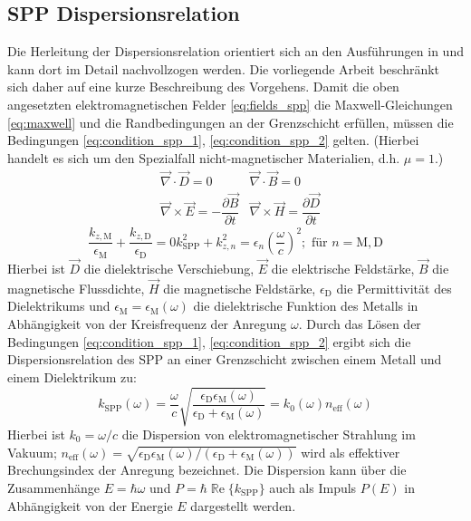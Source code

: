 \documentclass[a4paper, titlepage,  ngerman, fullpage]{book}
\renewcommand{\Re}{\operatorname{\mathbb{R}e}}
\begin{document}
	\subsection{SPP Dispersionsrelation}
	Die Herleitung der Dispersionsrelation orientiert sich an den Ausführungen in \cite[pp.~261--ff]{Fox.2020} und kann dort im Detail nachvollzogen werden. Die vorliegende Arbeit beschränkt sich daher auf eine kurze Beschreibung des Vorgehens. Damit die oben angesetzten elektromagnetischen Felder \eqref{eq:fields_spp}  die Maxwell-Gleichungen \eqref{eq:maxwell} und die Randbedingungen an der Grenzschicht erfüllen, müssen die Bedingungen \eqref{eq:condition_spp_1},  \eqref{eq:condition_spp_2} gelten. (Hierbei handelt es sich um den Spezialfall nicht-magnetischer Materialien, d.h. $\mu = 1$.)
	\begin{align}
		\label{eq:maxwell}	
		&\vec{\nabla}\cdot\vec{D} = 0		&\vec{\nabla}\cdot\vec{B} = 0 \\
		&\vec{\nabla}\times\vec{E} = -\dfrac{\partial\vec{B}}{\partial t} 
		&\vec{\nabla}\times\vec{H} = 	\dfrac{\partial\vec{D}}{\partial t}\nonumber
	\end{align}
	\begin{subequations}
		\begin{equation}
			\label{eq:condition_spp_1}
			\dfrac{k_{z, \mathrm{M}}}{\epsilon_\mathrm{M}} + \dfrac{k_{z, \mathrm{D}}}{\epsilon_\mathrm{D}} = 0
		\end{equation}		
		\begin{equation}
			\label{eq:condition_spp_2}
			k_{\mathrm{SPP}}^2 +k_{z, n}^2 = \epsilon_n\left(\dfrac{\omega}{c}\right)^2; \text{ für  } n=\mathrm{M,D}
		\end{equation}
	\end{subequations}
	Hierbei ist $\vec{D}$ die dielektrische Verschiebung, $\vec{E}$ die elektrische Feldstärke, $\vec{B}$ die magnetische Flussdichte, $\vec{H}$ die magnetische Feldstärke, 	$\epsilon_\mathrm{D}$ die Permittivität des Dielektrikums und $\epsilon_\mathrm{M} = \epsilon_\mathrm{M}(\omega)$ die dielektrische Funktion des Metalls in Abhängigkeit von der Kreisfrequenz der Anregung $\omega$. Durch das Lösen der Bedingungen \eqref{eq:condition_spp_1},  \eqref{eq:condition_spp_2} ergibt sich die Dispersionsrelation des SPP an einer Grenzschicht zwischen einem Metall und einem Dielektrikum zu: 
	\begin{equation}
		\label{eq:dispersion_spp}
		\boxed{
			k_{\mathrm{SPP}}\left(\omega\right) = \dfrac{\omega}{c} \sqrt{\dfrac{\epsilon_\mathrm{D}\epsilon_\mathrm{M}(\omega)}{\epsilon_\mathrm{D} + 	\epsilon_\mathrm{M}(\omega)}}  = k_0(\omega) n_{\mathrm{eff}}(\omega)}
	\end{equation}
	Hierbei ist $k_0 = \omega / c$ die Dispersion von elektromagnetischer Strahlung im Vakuum; $n_{\mathrm{eff}}(\omega) = \sqrt{\epsilon_\mathrm{D}\epsilon_\mathrm{M}(\omega)/(\epsilon_\mathrm{D} + 	\epsilon_\mathrm{M}(\omega))}$ wird als effektiver Brechungsindex der Anregung bezeichnet. Die Dispersion kann über die Zusammenhänge $E = \hbar \omega$ und $P = \hbar \Re\{k_\mathrm{SPP}\}$ auch als Impuls $P(E)$ in Abhängigkeit von der Energie $E$ dargestellt werden.
	
\end{document}
